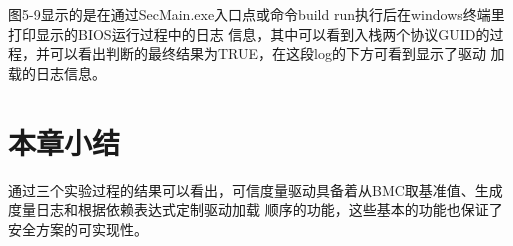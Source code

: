 图5-9显示的是在通过SecMain.exe入口点或命令build run执行后在windows终端里打印显示的BIOS运行过程中的日志
信息，其中可以看到入栈两个协议GUID的过程，并可以看出判断的最终结果为TRUE，在这段log的下方可看到显示了驱动
加载的日志信息。

%
%
\section{本章小结}
通过三个实验过程的结果可以看出，可信度量驱动具备着从BMC取基准值、生成度量日志和根据依赖表达式定制驱动加载
顺序的功能，这些基本的功能也保证了安全方案的可实现性。

